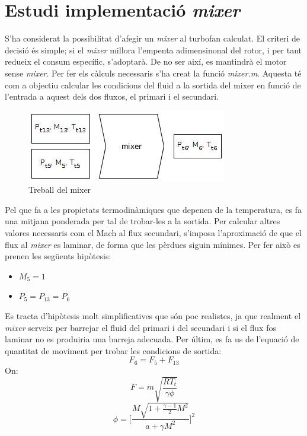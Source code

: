 \section{Estudi implementació \textit{mixer}}
S'ha considerat la possibilitat d'afegir un \textit{mixer} al turbofan calculat. El criteri de decisió és simple; si el \textit{mixer} millora l'empenta adimensinonal del rotor, i per tant redueix el consum específic, s'adoptarà. De no ser així, es mantindrà el motor sense \textit{mixer}. Per fer els càlculs necessaris s'ha creat la funció \textit{mixer.m}. Aquesta té com a objectiu calcular les condicions del fluid a la sortida del mixer en funció de l'entrada a aquest dels dos fluxos, el primari i el secundari.
\begin{figure}[H]
	\centering
	\includegraphics[scale=0.6]{./pics/mixer}
	\caption{Treball del mixer}
\end{figure}
\noindent Pel que fa a les propietats termodinàmiques que depenen de la temperatura, es fa una mitjana ponderada per tal de trobar-les a la sortida. Per calcular altres valores necessaris com el Mach al flux secundari, s'imposa l'aproximació de que el flux al \textit{mixer} es laminar, de forma que les pèrdues siguin mínimes. Per fer això es prenen les següents hipòtesis:
\begin{itemize}
\item $M_5 = 1$
\item $P_5 = P_{13} = P_6$
\end{itemize}
Es tracta d'hipòtesis molt simplificatives que són poc realistes, ja que realment el \textit{mixer} serveix per barrejar el fluid del primari i del secundari i si el flux fos laminar no es produiria una barreja adecuada. 
Per últim, es fa us de l'equació de quantitat de moviment per trobar les condicions de sortida:
\begin{equation}
\label{ccm}
F_6 = F_5 + F_{13}
\end{equation}
On:
\begin{equation}
F = \dot{m}\sqrt{\frac{RT_t}{\gamma\phi}}
\end{equation}
\begin{equation}
\label{phi}
\phi = \Bigg[ \frac{M\sqrt{1+\frac{\gamma-1}{2}M^2}}{a+\gamma M^2}\Bigg]^2
\end{equation}

